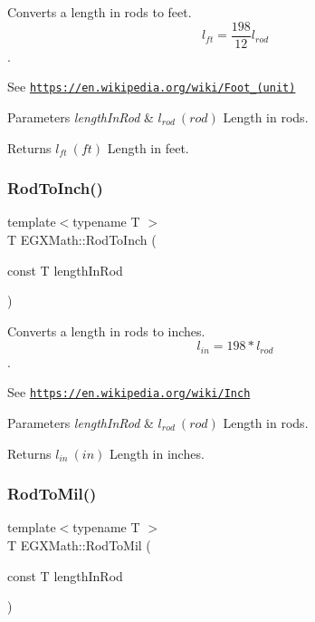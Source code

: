 Converts a length in rods to feet. \[ l_{ft}= \frac{198}{12} l_{rod} \]. 

See \href{https://en.wikipedia.org/wiki/Foot_(unit)}{\tt https\+://en.\+wikipedia.\+org/wiki/\+Foot\+\_\+(unit)} 
\begin{DoxyParams}{Parameters}
{\em length\+In\+Rod} & $ l_{rod}\ (rod)$ Length in rods. \\
\hline
\end{DoxyParams}
\begin{DoxyReturn}{Returns}
$ l_{ft}\ (ft)$ Length in feet. 
\end{DoxyReturn}
\mbox{\label{group___e_g_x_math-_conversions-_length_conversions-_surveyors-_rod-_imperial_gaa49be09f9d06ac2d8a5e0c3079a8ce5d}} 
\subsubsection{\texorpdfstring{Rod\+To\+Inch()}{RodToInch()}}
{\footnotesize\ttfamily template$<$typename T $>$ \\
T E\+G\+X\+Math\+::\+Rod\+To\+Inch (\begin{DoxyParamCaption}\item[{const T}]{length\+In\+Rod }\end{DoxyParamCaption})}



Converts a length in rods to inches. \[ l_{in}= 198 * l_{rod} \]. 

See \href{https://en.wikipedia.org/wiki/Inch}{\tt https\+://en.\+wikipedia.\+org/wiki/\+Inch} 
\begin{DoxyParams}{Parameters}
{\em length\+In\+Rod} & $ l_{rod}\ (rod)$ Length in rods. \\
\hline
\end{DoxyParams}
\begin{DoxyReturn}{Returns}
$ l_{in}\ (in)$ Length in inches. 
\end{DoxyReturn}
\mbox{\label{group___e_g_x_math-_conversions-_length_conversions-_surveyors-_rod-_imperial_ga8458f45f5b02b4127d0d5626422b17c3}} 
\subsubsection{\texorpdfstring{Rod\+To\+Mil()}{RodToMil()}}
{\footnotesize\ttfamily template$<$typename T $>$ \\
T E\+G\+X\+Math\+::\+Rod\+To\+Mil (\begin{DoxyParamCaption}\item[{const T}]{length\+In\+Rod }\end{DoxyParamCaption})}



